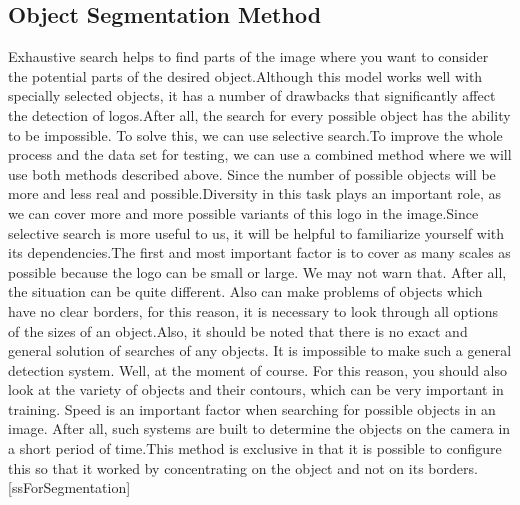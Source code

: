 \vspace{-0.3cm}

\subsection{Object Segmentation Method}\label{sec:4.2.1}
\vspace{-0.5cm}
\noindent Exhaustive search helps to find parts of the image where you want to consider the potential parts of the desired object.Although this model works well with specially selected objects, it has a number of drawbacks that significantly affect the detection of logos.After all, the search for every possible object has the ability to be impossible. To solve this, we can use selective search.To improve the whole process and the data set for testing, we can use a combined method where we will use both methods described above. Since the number of possible objects will be more and less real and possible.Diversity in this task plays an important role, as we can cover more and more possible variants of this logo in the image.Since selective search is more useful to us, it will be helpful to familiarize yourself with its dependencies.The first and most important factor is to cover as many scales as possible because the logo can be small or large. We may not warn that. After all, the situation can be quite different. Also can make problems of objects which have no clear borders, for this reason, it is necessary to look through all options of the sizes of an object.Also, it should be noted that there is no exact and general solution of searches of any objects. It is impossible to make such a general detection system. Well, at the moment of course. For this reason, you should also look at the variety of objects and their contours, which can be very important in training. Speed is an important factor when searching for possible objects in an image. After all, such systems are built to determine the objects on the camera in a short period of time.This method is exclusive in that it is possible to configure this so that it worked by concentrating on the object and not on its borders.[ssForSegmentation]


\vspace{-0.3cm}


